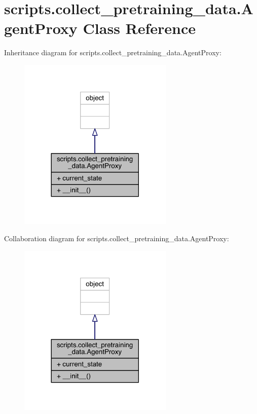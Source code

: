 \hypertarget{classscripts_1_1collect__pretraining__data_1_1_agent_proxy}{}\section{scripts.\+collect\+\_\+pretraining\+\_\+data.\+Agent\+Proxy Class Reference}
\label{classscripts_1_1collect__pretraining__data_1_1_agent_proxy}


Inheritance diagram for scripts.\+collect\+\_\+pretraining\+\_\+data.\+Agent\+Proxy\+:\nopagebreak
\begin{figure}[H]
\begin{center}
\leavevmode
\includegraphics[width=209pt]{classscripts_1_1collect__pretraining__data_1_1_agent_proxy__inherit__graph}
\end{center}
\end{figure}


Collaboration diagram for scripts.\+collect\+\_\+pretraining\+\_\+data.\+Agent\+Proxy\+:\nopagebreak
\begin{figure}[H]
\begin{center}
\leavevmode
\includegraphics[width=209pt]{classscripts_1_1collect__pretraining__data_1_1_agent_proxy__coll__graph}
\end{center}
\end{figure}
